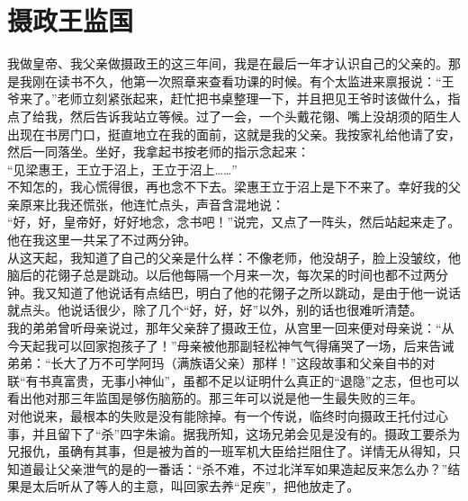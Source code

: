 \fancyhead[RO]{} %
\fancyhead[LE]{} %
\chapter*{摄政王监国}
\thispagestyle{empty}
我做皇帝、我父亲做摄政王的这三年间，我是在最后一年才认识自己的父亲的。那是我刚在读书不久，他第一次照章来查看功课的时候。有个太监进来禀报说：“王爷来了。”老师立刻紧张起来，赶忙把书桌整理一下，并且把见王爷时该做什么，指点了给我，然后告诉我站立等候。过了一会，一个头戴花翎、嘴上没胡须的陌生人出现在书房门口，挺直地立在我的面前，这就是我的父亲。我按家礼给他请了安，然后一同落坐。坐好，我拿起书按老师的指示念起来：\\

“见梁惠王，王立于沼上，王立于沼上……”\\

不知怎的，我心慌得很，再也念不下去。梁惠王立于沼上是下不来了。幸好我的父亲原来比我还慌张，他连忙点头，声音含混地说：\\

“好，好，皇帝好，好好地念，念书吧！”说完，又点了一阵头，然后站起来走了。他在我这里一共呆了不过两分钟。\\

从这天起，我知道了自己的父亲是什么样：不像老师，他没胡子，脸上没皱纹，他脑后的花翎子总是跳动。以后他每隔一个月来一次，每次呆的时间也都不过两分钟。我又知道了他说话有点结巴，明白了他的花翎子之所以跳动，是由于他一说话就点头。他说话很少，除了几个“好，好，好”以外，别的话也很难听清楚。\\

我的弟弟曾听母亲说过，那年父亲辞了摄政王位，从宫里一回来便对母亲说：“从今天起我可以回家抱孩子了！”母亲被他那副轻松神气气得痛哭了一场，后来告诫弟弟：“长大了万不可学阿玛（满族语父亲）那样！”这段故事和父亲自书的对联“有书真富贵，无事小神仙”，虽都不足以证明什么真正的“退隐”之志，但也可以看出他对那三年监国是够伤脑筋的。那三年可以说是他一生最失败的三年。\\

对他说来，最根本的失败是没有能除掉。有一个传说，临终时向摄政王托付过心事，并且留下了“杀”四字朱谕。据我所知，这场兄弟会见是没有的。摄政工要杀为兄报仇，虽确有其事，但是被为首的一班军机大臣给拦阻住了。详情无从得知，只知道最让父亲泄气的是的一番话：“杀不难，不过北洋军如果造起反来怎么办？”结果是太后听从了等人的主意，叫回家去养“足疾”，把他放走了。\\

